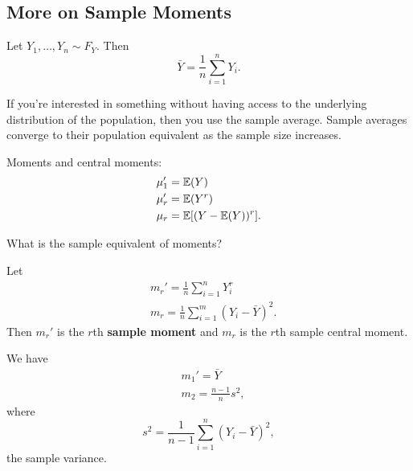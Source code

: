 \subsection{More on Sample Moments}

\begin{recall}
    Let $Y_1,\dots, Y_n\sim F_Y$. Then
    $$
    \bar Y= \frac{1}{n}\sum^n_{i=1}Y_i.
    $$
\end{recall} 

\begin{remark}
    If you're interested in something without having access to the underlying distribution of the population, then you use the sample average. Sample averages converge to their population equivalent as the sample size increases. 
\end{remark}

\begin{recall}
		Moments and central moments:
    \begin{align*}
        &\mu_1'=\mathbb E(Y) \\
        &\mu_r'=\mathbb E(Y^r) \\
        &\mu_r=\mathbb E[(Y-\mathbb E(Y))^r].
    \end{align*}
\end{recall}

What is the sample equivalent of moments?

\begin{definition}
	Let
    \begin{align*}
        &m_r'=\frac{1}{n}\sum^n_{i=1}Y_i^r \\
		&m_r=\frac{1}{n}\sum^m_{i=1}(Y_i-\bar Y)^2.
    \end{align*}
	Then $m_r'$ is the $r$th \textbf{sample moment} and $m_r$ is the $r$th {sample central moment}.
\end{definition}

    \begin{eg}
    We have
    \begin{align*}
        &m_1'=\bar Y \\
        &m_2=\frac{n-1}{n}s^2,
    \end{align*}
    where
    $$
    s^2=\frac{1}{n-1}\sum^n_{i=1}(Y_i-\bar Y)^2,
    $$
	the sample variance.
    \end{eg}

